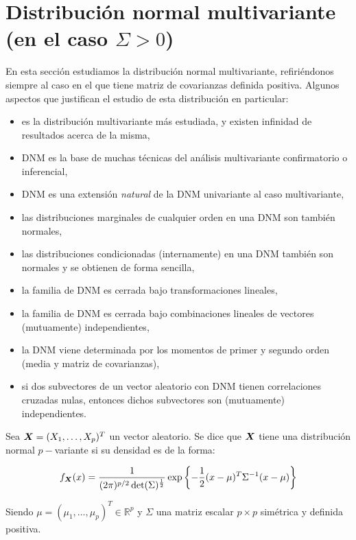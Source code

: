 \section{Distribución normal multivariante (en el caso $\Sigma > 0$)}
  En esta sección estudiamos la distribución normal multivariante, refiriéndonos siempre al caso en el que tiene matriz de covarianzas definida positiva.
Algunos aspectos que justifican el estudio de esta distribución en particular:
\begin{itemize}
\item es la distribución multivariante más estudiada, y existen infinidad de resultados acerca de la misma,
\item DNM es la base de muchas técnicas del análisis multivariante confirmatorio o inferencial,
\item DNM es una extensión \emph{natural} de la DNM univariante al caso multivariante,
\item las distribuciones marginales de cualquier orden en una DNM son también normales,
\item las distribuciones condicionadas (internamente) en una DNM también son normales y se obtienen de forma sencilla,
\item la familia de DNM es cerrada bajo transformaciones lineales,
\item la familia de DNM es cerrada bajo combinaciones lineales de vectores (mutuamente) independientes,
\item la DNM viene determinada por los momentos de primer y segundo orden (media y matriz de covarianzas),
  \item si dos subvectores de un vector aleatorio con DNM tienen correlaciones cruzadas nulas, entonces dichos subvectores son (mutuamente) independientes.

\end{itemize}


\begin{ndef} \label{posvar:defnormal}
  Sea $\boldsymbol{X} = (X_1,\dots, X_p)^T$ un vector aleatorio. Se dice que $\boldsymbol{X}$ tiene una distribución normal $p-$variante si su densidad es de la forma:
  
  \[
    f_{\boldsymbol{X}}(x) = \frac{1}{(2\pi)^{p/2}\det(\Sigma)^{\frac{1}{2}}} \exp\left\{- \dfrac{1}{2}(x-\mu)^T \Sigma^{-1}(x-\mu)\right\}
  \]

Siendo $\mu = (\mu_1, \dots, \mu_p)^T \in \mathbb R^p$ y $\Sigma$ una matriz escalar $p\times p$ simétrica y definida positiva.
\end{ndef}

